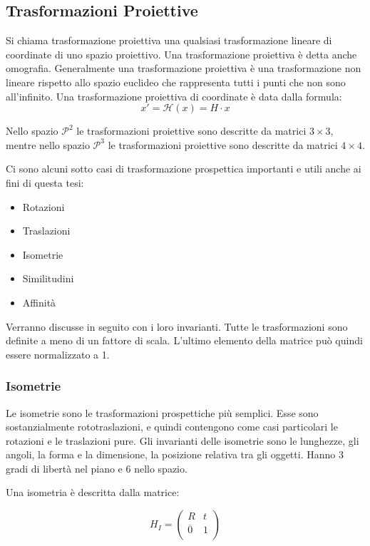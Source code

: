 \subsection{Trasformazioni Proiettive}

Si chiama trasformazione proiettiva una qualsiasi trasformazione lineare di coordinate di uno spazio proiettivo. Una trasformazione proiettiva è detta anche omografia.
Generalmente una trasformazione proiettiva è una trasformazione non lineare rispetto allo spazio euclideo che rappresenta tutti i punti che non sono all'infinito.
Una trasformazione proiettiva di coordinate è data dalla formula:
\begin{equation*}
 x' = \mathcal{H}(x) = H\cdot x
\end{equation*}

Nello spazio $\mathcal{P}^2$ le trasformazioni proiettive sono descritte da matrici $3\times3$, mentre nello spazio $\mathcal{P}^3$ le trasformazioni proiettive sono descritte da matrici $4\times4$.

Ci sono alcuni sotto casi di trasformazione prospettica importanti e utili anche ai fini di questa tesi:

\begin{itemize}
 \item Rotazioni
 \item Traslazioni
 \item Isometrie
 \item Similitudini
 \item Affinità
\end{itemize}

Verranno discusse in seguito con i loro invarianti.
Tutte le trasformazioni sono definite a meno di un fattore di scala. L'ultimo elemento della matrice può quindi essere normalizzato a 1.

\subsubsection{Isometrie}

Le isometrie sono le trasformazioni prospettiche più semplici. Esse sono sostanzialmente rototraslazioni, e quindi contengono come casi particolari le rotazioni e le traslazioni pure. Gli invarianti delle isometrie sono le lunghezze, gli angoli, la forma e la dimensione, la posizione relativa tra gli oggetti. Hanno 3 gradi di libertà nel piano e 6 nello spazio.

Una isometria è descritta dalla matrice:

\begin{equation*}
  H_I = \begin{pmatrix}
   R & t \\
   \overline{0} & 1 \\
  \end{pmatrix}
\end{equation*}

